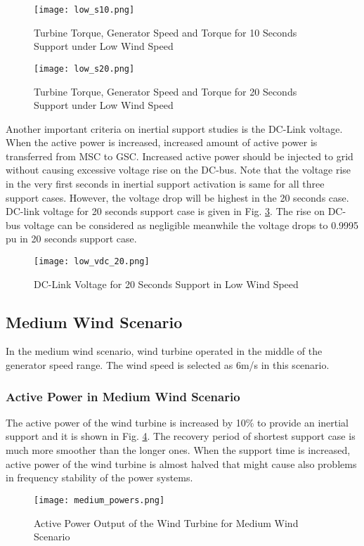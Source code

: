 \begin{figure}[h!]
	\centering
	\texttt{[image: low\_s10.png]}
	\caption{Turbine Torque, Generator Speed and Torque for 10 Seconds Support under Low Wind Speed}
	\label{low_torques2}
\end{figure}
\begin{figure}[h!]
	\centering
	\texttt{[image: low\_s20.png]}
	\caption{Turbine Torque, Generator Speed and Torque for 20 Seconds Support under Low Wind Speed}
	\label{low_torques3}
\end{figure}
Another important criteria on inertial support studies is the DC-Link voltage. When the active power is increased, increased amount of active power is transferred from MSC to GSC. Increased active power should be injected to grid without causing excessive voltage rise on the DC-bus. Note that the voltage rise in the very first seconds in inertial support activation is same for all three support cases. However, the voltage drop will be highest in the 20 seconds case. DC-link voltage for 20 seconds support case is given in Fig. \ref{low_vdc_s20}. The rise on DC-bus voltage can be considered as negligible meanwhile the voltage drops to 0.9995 pu in 20 seconds support case.
\begin{figure}[h!]
	\centering
	\texttt{[image: low\_vdc\_20.png]}
	\caption{DC-Link Voltage for 20 Seconds Support in Low Wind Speed}
	\label{low_vdc_s20}
\end{figure}
\subsection{Medium Wind Scenario}
In the medium wind scenario, wind turbine operated in the middle of the generator speed range. The wind speed is selected as 6m/s in this scenario. 
\subsubsection{Active Power in Medium Wind Scenario}
The active power of the wind turbine is increased by 10\% to provide an inertial support and it is shown in Fig. \ref{midpowers}. The recovery period of shortest support case is much more smoother than the longer ones. When the support time is increased, active power of the wind turbine is almost halved that might cause also problems in frequency stability of the power systems.
\begin{figure}[h!]
	\centering
	\texttt{[image: medium\_powers.png]}
	\caption{Active Power Output of the Wind Turbine for Medium Wind Scenario}
	\label{midpowers}
\end{figure}
